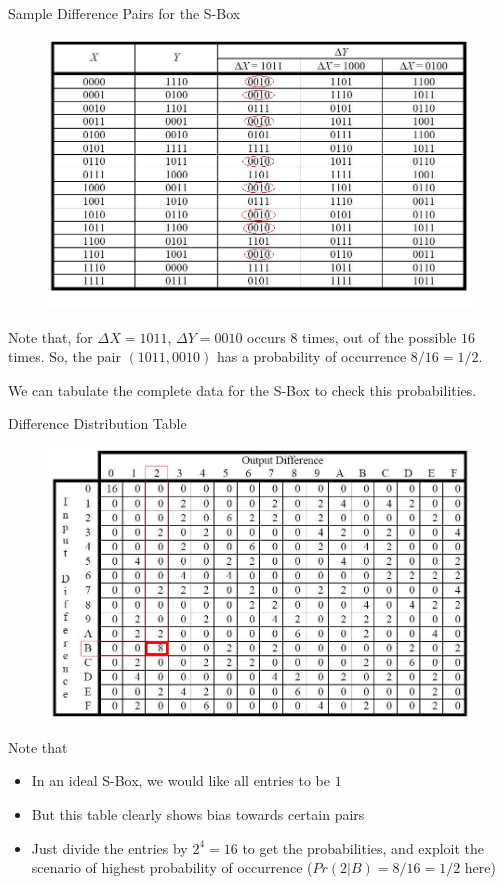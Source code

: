 \documentclass[9pt]{beamer}
\begin{document}
\begin{frame}
Sample Difference Pairs for the S-Box

\begin{figure}
\includegraphics[totalheight=0.6\textheight]{spn_sbox_diffpairs.jpg}
\end{figure}

\pause Note that, for $\Delta X = 1011$, $\Delta Y = 0010$ occurs $8$ times, out of the possible $16$ times. So, the pair $(1011,0010)$ has a probability of occurrence $8/16 = 1/2$. 

\vspace{2mm}
\pause We can tabulate the complete data for the S-Box to check this probabilities.
\end{frame}

\begin{frame}
Difference Distribution Table

\begin{figure}
\includegraphics[totalheight=0.6\textheight]{spn_sbox_disttable.jpg}
\end{figure}

\pause Note that
\begin{itemize}[<+->]
\item{In an ideal S-Box, we would like all entries to be $1$}
\item{But this table clearly shows bias towards certain pairs}
\item{Just divide the entries by $2^4 = 16$ to get the probabilities, and exploit the scenario of highest probability of occurrence ($Pr(2|B) = 8/16 = 1/2$ here)}
\end{itemize}
\end{frame}
\end{document}
